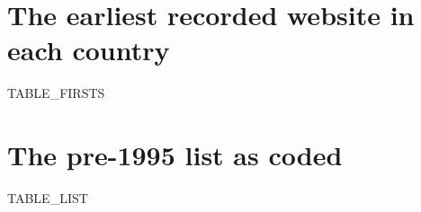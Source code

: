 \documentclass[11pt,a4paper]{article}
\begin{document}
\clearpage
\appendix
\section{The earliest recorded website in each country}
{{TABLE_FIRSTS}}

\section{The pre-1995 list as coded}
{{TABLE_LIST}}
\end{document}
